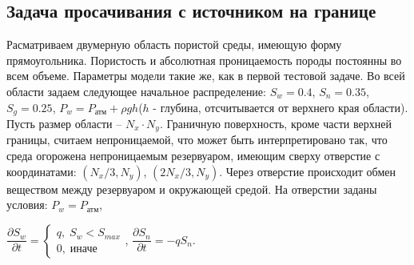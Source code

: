 \subsection{Задача просачивания с источником на границе}
Расматриваем двумерную область пористой среды, имеющую форму
прямоугольника. Пористость и абсолютная проницаемость породы постоянны во всем
объеме. Параметры модели такие же, как
в первой тестовой задаче.
Во всей области задаем следующее 
начальное распределение: $S_w=0.4$,\; $S_n=0.35$,\; $S_g=0.25$, 
$P_w=P_\text{атм}+\rho g h$($h$ - глубина, отсчитывается от верхнего края области).
Пусть размер области -- $N_x\cdot N_y$.
Граничную поверхность, кроме части верхней границы, считаем непроницаемой, 
что может быть интерпретировано так,
что среда огорожена непроницаемым резервуаром, имеющим сверху отверстие с
координатами: $(N_x/3, N_y)$, $(2N_x/3, N_y)$. Через отверстие происходит обмен веществом между 
резервуаром и окружающей средой. На отверстии заданы условия: $P_w=P_\text{атм}$,

$ \dfrac{\partial S_w}{\partial t}= 
\begin{cases}
 q, \; S_w<S_{max}\\
 0, \; \text{иначе}
\end{cases}
$,
$ \dfrac{\partial S_n}{\partial t}=-q S_n$.
